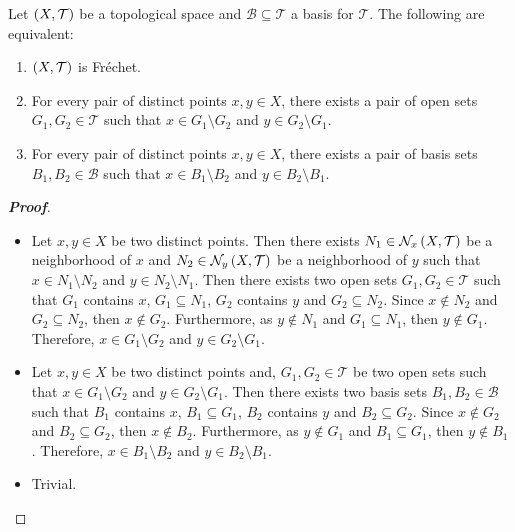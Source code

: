 \begin{proposition}
  Let $\left(X,\mathcal{T}\right)$ be a topological space and $\mathcal{B}\subseteq\mathcal{T}$ a basis for $\mathcal{T}$. The following are equivalent:

  \begin{enumerate}
    \item $\left(X,\mathcal{T}\right)$ is Fréchet.
    \item For every pair of distinct points $x,y\in X$, there exists a pair of open sets $G_1,G_2\in\mathcal{T}$ such that $x\in G_1\setminus G_2$ and $y\in G_2\setminus G_1$.
    \item For every pair of distinct points $x,y\in X$,  there exists a pair of basis sets $B_1,B_2\in\mathcal{B}$ such that $x\in B_1\setminus B_2$ and $y\in B_2\setminus B_1$.
  \end{enumerate}
  
  \begin{proof}[\rm\textbf{Proof}]
    \hfill
    \begin{itemize}
      \item[\boxed{1\Rightarrow2}] Let $x,y\in X$ be two distinct points. Then there exists $N_1\in\mathcal{N}_x\left(X,\mathcal{T}\right)$ be a neighborhood of $x$ and $N_2\in\mathcal{N}_y\left(X,\mathcal{T}\right)$ be a neighborhood of $y$ such that $x\in N_1\setminus N_2$ and $y\in N_2\setminus N_1$. Then there exists two open sets $G_1,G_2\in\mathcal{T}$ such that $G_1$ contains $x$, $G_1\subseteq N_1$, $G_2$ contains $y$ and $G_2\subseteq N_2$. Since $x\notin N_2$ and $G_2\subseteq N_2$, then $x\notin G_2$. Furthermore, as $y\notin N_1$ and $G_1\subseteq N_1$, then $y\notin G_1$. Therefore, $x\in G_1\setminus G_2$ and $y\in G_2\setminus G_1$.
      \item[\boxed{2\Rightarrow3}] Let $x,y\in X$ be two distinct points and, $G_1,G_2\in\mathcal{T}$ be two open sets such that $x\in G_1\setminus G_2$ and $y\in G_2\setminus G_1$. Then there exists two basis sets $B_1,B_2\in\mathcal{B}$ such that $B_1$ contains $x$, $B_1\subseteq G_1$, $B_2$ contains $y$ and $B_2\subseteq G_2$. Since $x\notin G_2$ and $B_2\subseteq G_2$, then $x\notin B_2$. Furthermore, as $y\notin G_1$ and $B_1\subseteq G_1$, then $y\notin B_1$. Therefore, $x\in B_1\setminus B_2$ and $y\in B_2\setminus B_1$.
      \item[\boxed{3\Rightarrow1}] Trivial.
    \end{itemize}
  \end{proof}
\end{proposition}

